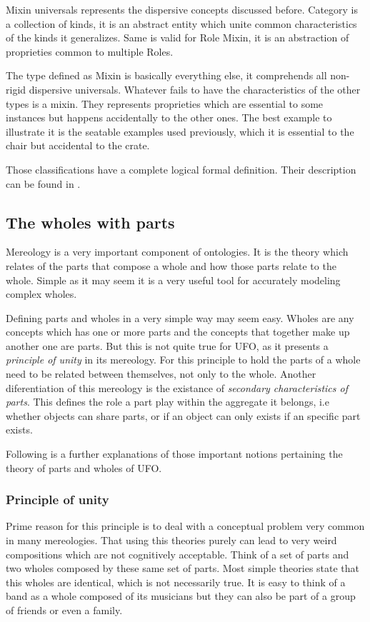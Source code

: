 Mixin universals represents the dispersive concepts discussed before. Category is a collection of kinds, it is an abstract entity which unite common characteristics of the kinds it generalizes. Same is valid for Role Mixin, it is an abstraction of proprieties common to multiple Roles. 

The type defined as Mixin is basically everything else, it comprehends all non-rigid dispersive universals. Whatever fails to have the characteristics of the other types is a mixin. They represents proprieties which are essential to some instances but happens accidentally to the other ones. The best example to illustrate it is the seatable examples used previously, which it is essential to the chair but accidental to the crate.

Those classifications have a complete logical formal definition. Their description can be found in \cite{guizzardi_ontological_2005}.

\subsection{The wholes with parts}

Mereology is a very important component of ontologies. It is the theory which relates of the parts that compose a whole and how those parts relate to the whole. Simple as it may seem it is a very useful tool for accurately modeling complex wholes.

Defining parts and wholes in a very simple way may seem easy. Wholes are any concepts which has one or more parts and the concepts that together make up another one are parts. But this is not quite true for UFO, as it presents a \textit{principle of unity} in its mereology. For this principle to hold the parts of a whole need to be related between themselves, not only to the whole. Another diferentiation of this mereology is the existance of \textit{secondary characteristics of parts}. This defines the role a part play within the aggregate it belongs, i.e whether objects can share parts, or if an object can only exists if an specific part exists. 

Following is a further explanations of those important notions pertaining the theory of parts and wholes of UFO.

\subsubsection{Principle of unity}

Prime reason for this principle is to deal with a conceptual problem very common in many mereologies. That using this theories purely can lead to very weird compositions which are not cognitively acceptable. Think of a set of parts and two wholes composed by these same set of parts. Most simple theories state that this wholes are identical, which is not necessarily true. It is easy to think of a band as a whole composed of its musicians but they can also be part of a group of friends or even a family. 

